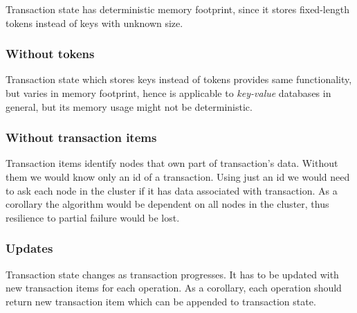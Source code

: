  

Transaction state has deterministic memory footprint, since it stores fixed-length tokens instead of keys with unknown size.

\subsubsection{Without tokens}
Transaction state which stores keys instead of tokens provides same functionality, but varies in memory footprint, hence \mpp is applicable to \emph{key-value} databases in general, but its memory usage might not be deterministic.

\subsubsection{Without transaction items}
Transaction items identify nodes that own part of transaction's data. Without them we would know only an id of a transaction.
Using just an id we would need to ask each node in the cluster if it has data associated with transaction. As a corollary the algorithm would be dependent on all nodes in the cluster, thus resilience to partial failure would be lost.

\subsubsection{Updates}
Transaction state changes as transaction progresses. It has to be updated with new transaction items for each operation. As a corollary, each operation should return new transaction item which can be appended to transaction state. 



